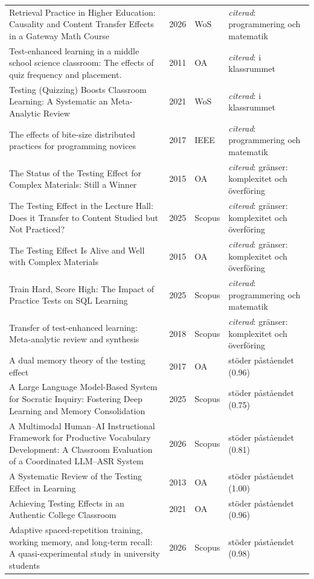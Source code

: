 \begin{longtable}{@{}%
  >{\raggedright\arraybackslash}p{}c%
  >{\raggedright\arraybackslash}p{}%
  >{\raggedright\arraybackslash}p{}@{}}
Retrieval Practice in Higher Education: Causality and Content Transfer Effects in a Gateway Math Course & 2026 & WoS & \emph{citerad}: programmering och matematik \\
Test-enhanced learning in a middle school science classroom: The effects of quiz frequency and placement. & 2011 & OA & \emph{citerad}: i klassrummet \\
Testing (Quizzing) Boosts Classroom Learning: A Systematic an Meta-Analytic Review & 2021 & WoS & \emph{citerad}: i klassrummet \\
The effects of bite-size distributed practices for programming novices & 2017 & IEEE & \emph{citerad}: programmering och matematik \\
The Status of the Testing Effect for Complex Materials: Still a Winner & 2015 & OA & \emph{citerad}: gränser: komplexitet och överföring \\
The Testing Effect in the Lecture Hall: Does it Transfer to Content Studied but Not Practiced? & 2025 & Scopus & \emph{citerad}: gränser: komplexitet och överföring \\
The Testing Effect Is Alive and Well with Complex Materials & 2015 & OA & \emph{citerad}: gränser: komplexitet och överföring \\
Train Hard, Score High: The Impact of Practice Tests on SQL Learning & 2025 & Scopus & \emph{citerad}: programmering och matematik \\
Transfer of test-enhanced learning: Meta-analytic review and synthesis & 2018 & Scopus & \emph{citerad}: gränser: komplexitet och överföring \\
A dual memory theory of the testing effect & 2017 & OA & stöder påståendet (0.96) \\
A Large Language Model-Based System for Socratic Inquiry: Fostering Deep Learning and Memory Consolidation & 2025 & Scopus & stöder påståendet (0.75) \\
A Multimodal Human--AI Instructional Framework for Productive Vocabulary Development: A Classroom Evaluation of a Coordinated LLM--ASR System & 2026 & Scopus & stöder påståendet (0.81) \\
A Systematic Review of the Testing Effect in Learning & 2013 & OA & stöder påståendet (1.00) \\
Achieving Testing Effects in an Authentic College Classroom & 2021 & OA & stöder påståendet (0.96) \\
Adaptive spaced-repetition training, working memory, and long-term recall: A quasi-experimental study in university students & 2026 & Scopus & stöder påståendet (0.98) \\

\end{longtable}
